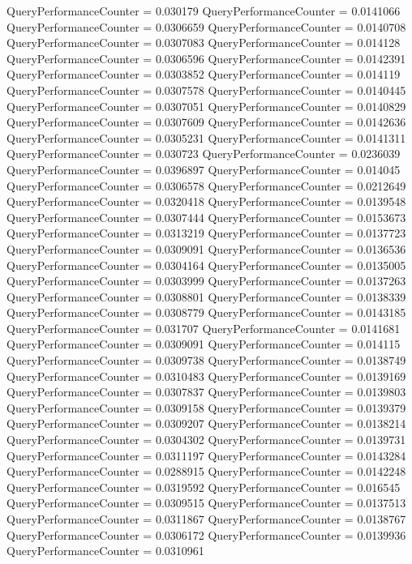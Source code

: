 \documentclass[9pt]{article}
\theoremstyle{plain}
\theoremstyle{definition}
\theoremstyle{remark}
\numberwithin{equation}{section}
\begin{document}
QueryPerformanceCounter  =  0.030179
QueryPerformanceCounter  =  0.0141066
QueryPerformanceCounter  =  0.0306659
QueryPerformanceCounter  =  0.0140708
QueryPerformanceCounter  =  0.0307083
QueryPerformanceCounter  =  0.014128
QueryPerformanceCounter  =  0.0306596
QueryPerformanceCounter  =  0.0142391
QueryPerformanceCounter  =  0.0303852
QueryPerformanceCounter  =  0.014119
QueryPerformanceCounter  =  0.0307578
QueryPerformanceCounter  =  0.0140445
QueryPerformanceCounter  =  0.0307051
QueryPerformanceCounter  =  0.0140829
QueryPerformanceCounter  =  0.0307609
QueryPerformanceCounter  =  0.0142636
QueryPerformanceCounter  =  0.0305231
QueryPerformanceCounter  =  0.0141311
QueryPerformanceCounter  =  0.030723
QueryPerformanceCounter  =  0.0236039
QueryPerformanceCounter  =  0.0396897
QueryPerformanceCounter  =  0.014045
QueryPerformanceCounter  =  0.0306578
QueryPerformanceCounter  =  0.0212649
QueryPerformanceCounter  =  0.0320418
QueryPerformanceCounter  =  0.0139548
QueryPerformanceCounter  =  0.0307444
QueryPerformanceCounter  =  0.0153673
QueryPerformanceCounter  =  0.0313219
QueryPerformanceCounter  =  0.0137723
QueryPerformanceCounter  =  0.0309091
QueryPerformanceCounter  =  0.0136536
QueryPerformanceCounter  =  0.0304164
QueryPerformanceCounter  =  0.0135005
QueryPerformanceCounter  =  0.0303999
QueryPerformanceCounter  =  0.0137263
QueryPerformanceCounter  =  0.0308801
QueryPerformanceCounter  =  0.0138339
QueryPerformanceCounter  =  0.0308779
QueryPerformanceCounter  =  0.0143185
QueryPerformanceCounter  =  0.031707
QueryPerformanceCounter  =  0.0141681
QueryPerformanceCounter  =  0.0309091
QueryPerformanceCounter  =  0.014115
QueryPerformanceCounter  =  0.0309738
QueryPerformanceCounter  =  0.0138749
QueryPerformanceCounter  =  0.0310483
QueryPerformanceCounter  =  0.0139169
QueryPerformanceCounter  =  0.0307837
QueryPerformanceCounter  =  0.0139803
QueryPerformanceCounter  =  0.0309158
QueryPerformanceCounter  =  0.0139379
QueryPerformanceCounter  =  0.0309207
QueryPerformanceCounter  =  0.0138214
QueryPerformanceCounter  =  0.0304302
QueryPerformanceCounter  =  0.0139731
QueryPerformanceCounter  =  0.0311197
QueryPerformanceCounter  =  0.0143284
QueryPerformanceCounter  =  0.0288915
QueryPerformanceCounter  =  0.0142248
QueryPerformanceCounter  =  0.0319592
QueryPerformanceCounter  =  0.016545
QueryPerformanceCounter  =  0.0309515
QueryPerformanceCounter  =  0.0137513
QueryPerformanceCounter  =  0.0311867
QueryPerformanceCounter  =  0.0138767
QueryPerformanceCounter  =  0.0306172
QueryPerformanceCounter  =  0.0139936
QueryPerformanceCounter  =  0.0310961
\end{document}

